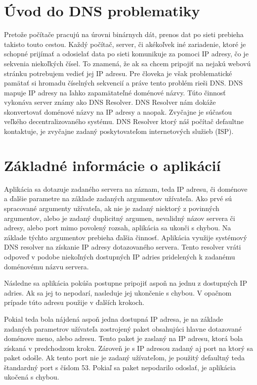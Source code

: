 \documentclass[a4paper,11pt]{article}
\begin{document}
\section{Úvod do DNS problematiky}
Pretože počítače pracujú na úrovni binárnych dát, prenos dat po sieti prebieha takisto touto cestou. Každý počítač, server, či akékoľvek iné zariadenie, ktoré je schopné prijímať a odosielať data po sieti komunikuje za pomoci IP adresy, čo je sekvenia niekoľkých čísel. To znamená, že ak sa chcem pripojiť na nejakú webovú stránku potrebujem vedieť jej IP adresu. Pre človeka je však problematické pamätať si hromadu číselných sekvencií a práve tento problém rieši DNS. DNS mapuje IP adresy na ľahko zapamätateľné doménové názvy. Túto činnosť vykonáva server známy ako DNS Resolver. DNS Resolver nám dokáže skonvertovať doménové názvy na IP adresy a naopak. Zvyčajne je súčasťou veľkého decentralizovaného systému. DNS Resolver ktorý náš počítač defaultne kontaktuje, je zvyčajne zadaný poskytovateľom internetových služieb (ISP).

\section{Základné informácie o aplikácií}
Aplikácia sa dotazuje zadaného servera na záznam, teda IP adresu, či doménove a ďalšie parametre na základe zadaných argumentov užívateľa. Ako prvé sú spracované argumenty užívateľa, ak nie je zadaný niektorý z povinných argumentov, alebo je zadaný duplicitný argumen, nevalidný názov servera či adresy, alebo port mimo povolený rozsah, aplikácia sa ukonči s chybou. Na základe týchto argumentov prebieha ďalšia činnosť. 
Aplikácia využije systémový DNS resolver na získanie IP adresy dotazovaného servera. Tento resolver vráti odpoveď v podobe niekoľných dostupných IP adries pridelených k zadanému doménovému názvu servera. 

Následne sa aplikácia pokúša postupne pripojiť aspoň na jednu z dostupných IP adries. Ak sa jej to nepodarí, nasleduje jej ukončenie s chybou. V opačnom prípade túto adresu použije v ďalších krokoch. 

Pokial teda bola nájdená aspoň jedna dostupná IP adresa, je na základe zadaných parametrov užívateľa zostrojený paket obsahujúci hlavne dotazované doménove meno, alebo adresu. Tento paket je zaslaný na IP adresu, ktorá bola získaná v predchodzom kroku. Zároveň je s IP adresou zadaný aj port na ktorý sa paket odošle. Ak tento port nie je zadaný užívateľom, je použitý defaultný teda štandardný port s číslom 53. Pokiaľ sa paket nepodarilo odoslať, je aplikácia ukočená s chybou. 
\end{document}
